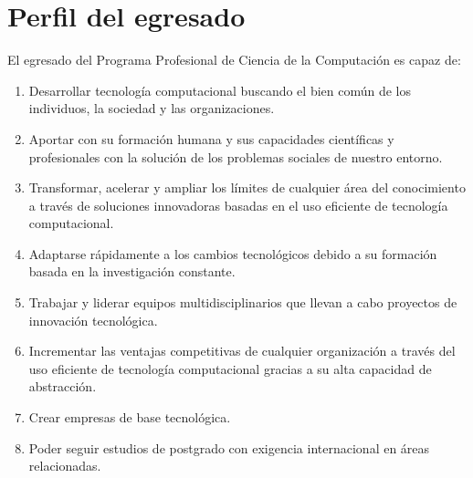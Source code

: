 \section{Perfil del egresado}

El egresado del Programa Profesional de Ciencia de la Computación es capaz de: 
\begin{enumerate}
\item Desarrollar tecnología computacional buscando el bien común de los individuos, la sociedad y las organizaciones.
\item Aportar con su formación humana y sus capacidades científicas y profesionales con la solución de los problemas sociales de nuestro entorno.
\item Transformar, acelerar y ampliar los límites de cualquier área del conocimiento a través de soluciones innovadoras basadas en el uso eficiente de tecnología computacional.
\item Adaptarse rápidamente a los cambios tecnológicos debido a su formación basada en la investigación constante.
\item Trabajar y liderar equipos multidisciplinarios que llevan a cabo proyectos de innovación tecnológica.
\item Incrementar las ventajas competitivas de cualquier organización a través del uso eficiente de tecnología computacional gracias a su alta capacidad de abstracción.
\item Crear empresas de base tecnológica.
\item Poder seguir estudios de postgrado con exigencia internacional en áreas relacionadas.
\end{enumerate}